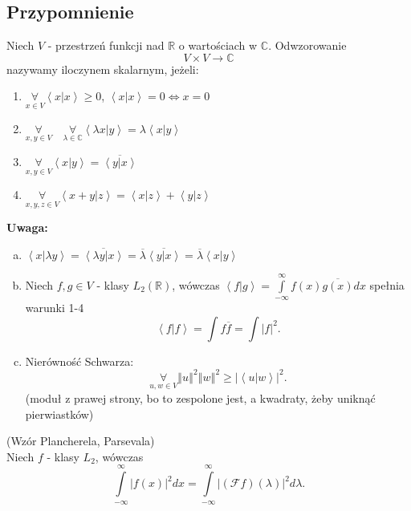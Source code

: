 \documentclass[../main.tex]{subfiles}
\begin{document}
    \subsection{Przypomnienie}
    Niech $V$ - przestrzeń funkcji nad $\mathbb{R}$ o wartościach w $\mathbb{C}$. Odwzorowanie
    \[
        V\times V\to \mathbb{C}
    \]
    nazywamy iloczynem skalarnym, jeżeli:
    \begin{enumerate}
        \item $\underset{x\in V}{\forall} \left<x | x \right> \ge 0$, $\left<x | x \right> = 0 \iff x = 0$
        \item $\underset{x,y\in V}{\forall} \quad \underset{\lambda\in \mathbb{C}}{\forall} \left<\lambda x | y \right> = \lambda \left<x|y \right>$
        \item $\underset{x,y\in V}{\forall} \left<x|y \right> = \overline{\left<y|x \right>}$
        \item $\underset{x,y,z\in V}{\forall} \left<x+y|z \right> = \left<x|z \right> + \left<y|z \right>$
    \end{enumerate}
    \textbf{Uwaga:}
    \begin{enumerate}[a)]
        \item $\left<x | \lambda y \right> = \overline{\left< \lambda y | x \right>} = \overline{\lambda} \overline{\left<y|x \right>} = \overline{\lambda}\left<x|y \right>$
        \item Niech $f, g\in V$ - klasy $L_2(\mathbb{R})$, wówczas $\left<f|g \right> = \int\limits_{-\infty}^{\infty} f(x)\overline{g(x)}dx $ spełnia warunki 1-4
            \[
                \left<f|f \right> = \int f \overline{f} = \int |f|^2
            .\]
    \item Nierówność Schwarza:
        \[
            \underset{u,w\in V}{\forall} \left\Vert u \right\Vert^2 \left\Vert w \right\Vert^2 \ge \left|\left<u|w \right>\right|^2
        .\]
    (moduł z prawej strony, bo to zespolone jest, a kwadraty, żeby uniknąć pierwiastków)
    \end{enumerate}
    \begin{tw}
        (Wzór Plancherela, Parsevala)\\
        Niech $f$ - klasy $L_2$, wówczas
        \[
            \int\limits_{-\infty}^{\infty} \left| f(x) \right| ^2 dx = \int\limits_{-\infty}^{\infty} \left| \left( \mathcal{F}f \right) (\lambda) \right| ^2 d \lambda
        .\]
    \end{tw}
\end{document}
